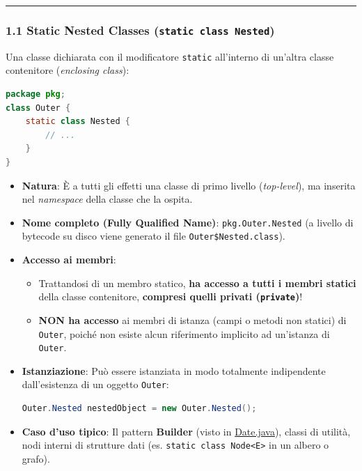\documentclass[11pt,a4paper]{article}
\newcommand{\passthrough}[1]{#1}
\providecommand{\tightlist}{\setlength{\itemsep}{0pt}\setlength{\parskip}{0pt}}
\begin{document}
\begin{center}\rule{0.5\linewidth}{0.5pt}\end{center}

\subsubsection{\texorpdfstring{1.1 Static Nested Classes
(\texttt{static\ class\ Nested})}{1.1 Static Nested Classes (static class Nested)}}\label{static-nested-classes-static-class-nested}

Una classe dichiarata con il modificatore
\passthrough{\lstinline!static!} all'interno di un'altra classe
contenitore (\emph{enclosing class}):

\begin{lstlisting}[language=Java]
package pkg;
class Outer {
    static class Nested {
        // ...
    }
}
\end{lstlisting}

\begin{itemize}
\item
  \textbf{Natura}: È a tutti gli effetti una classe di primo livello
  (\emph{top-level}), ma inserita nel \emph{namespace} della classe che
  la ospita.
\item
  \textbf{Nome completo (Fully Qualified Name)}:
  \passthrough{\lstinline!pkg.Outer.Nested!} (a livello di bytecode su
  disco viene generato il file
  \passthrough{\lstinline!Outer$Nested.class!}).
\item
  \textbf{Accesso ai membri}:

  \begin{itemize}
  \tightlist
  \item
    Trattandosi di un membro statico, \textbf{ha accesso a tutti i
    membri statici} della classe contenitore, \textbf{compresi quelli
    privati (\passthrough{\lstinline!private!})}!
  \item
    \textbf{NON ha accesso} ai membri di istanza (campi o metodi non
    statici) di \passthrough{\lstinline!Outer!}, poiché non esiste alcun
    riferimento implicito ad un'istanza di
    \passthrough{\lstinline!Outer!}.
  \end{itemize}
\item
  \textbf{Istanziazione}: Può essere istanziata in modo totalmente
  indipendente dall'esistenza di un oggetto
  \passthrough{\lstinline!Outer!}:

\begin{lstlisting}[language=Java]
Outer.Nested nestedObject = new Outer.Nested();
\end{lstlisting}
\item
  \textbf{Caso d'uso tipico}: Il pattern \textbf{Builder} (visto in
  \href{file:///home/wally/Documenti/GitHub/Programmazione-II/25-26/Teoria-e-Esercitazioni/Codice-20260902/Lezione14/MavenDate/src/main/java/it/oop/core/Date.java\#L85-L106}{Date.java}),
  classi di utilità, nodi interni di strutture dati (es.
  \passthrough{\lstinline!static class Node<E>!} in un albero o grafo).
\end{itemize}
\end{document}
